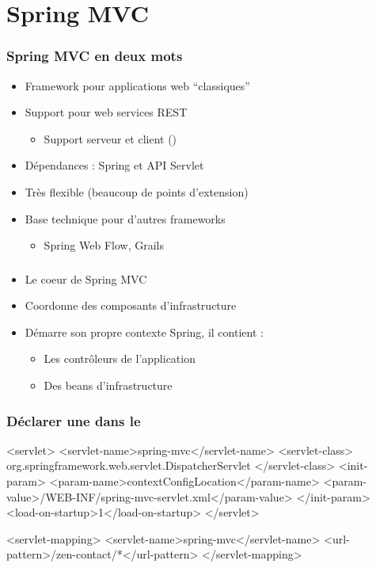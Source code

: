 \section{Spring MVC}


\begin{frame}
 \frametitle{Spring MVC en deux mots}
 \begin{itemize}
  \item Framework pour applications web ``classiques''
  \item Support pour web services REST
   \begin{itemize}
    \item Support serveur et client ()
   \end{itemize}
  \item Dépendances : Spring et API Servlet
  \item Très flexible (beaucoup de points d'extension)
  \item Base technique pour d'autres frameworks
  \begin{itemize}
   \item Spring Web Flow, Grails
  \end{itemize}
 \end{itemize}
\end{frame}

\begin{frame}
 \frametitle{}
 
 \begin{itemize}
  \item Le coeur de Spring MVC
  \item Coordonne des composants d'infrastructure
  \item Démarre son propre contexte Spring, il contient :
  \begin{itemize}
   \item Les contrôleurs de l'application
   \item Des beans d'infrastructure
  \end{itemize}
 \end{itemize}
\end{frame}

\begin{frame}[fragile]
 \frametitle{Déclarer une  dans le }
 
 \begin{xmlcode}
<servlet>
  <servlet-name>spring-mvc</servlet-name>
  <servlet-class>
    org.springframework.web.servlet.DispatcherServlet
  </servlet-class>
  <init-param>
    <param-name>contextConfigLocation</param-name>
    <param-value>/WEB-INF/spring-mvc-servlet.xml</param-value>
  </init-param>
  <load-on-startup>1</load-on-startup>
</servlet>

<servlet-mapping>
  <servlet-name>spring-mvc</servlet-name>
  <url-pattern>/zen-contact/*</url-pattern>
</servlet-mapping>
 \end{xmlcode}
 
\end{frame}

